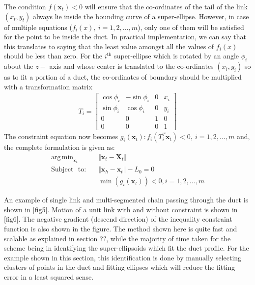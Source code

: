 \documentclass[12pt,a4]{article}
\DeclareMathOperator*{\argmin}{arg\,min}
\begin{document}
The condition $f(\textbf{x}_t)<0$ will ensure that the co-ordinates of the tail of the link $(x_t,y_t)$ always lie inside the bounding curve of a super-ellipse. However, in case of multiple equations (${f_i(x)},~ i=1,2,...,m$), only one of them will be satisfied for the point to be inside the duct. In practical implementation, we can say that this translates to saying that the least value amongst all the values of ${f_i(x)}$ should be less than zero. For the $i^\text{th}$ super-ellipse which is rotated by an angle $\phi_i$ about the $z-$ axis and whose center is translated to the co-ordinates $(x_i,y_i)$ so as to fit a portion of a duct, the co-ordinates of boundary should be multiplied with a transformation matrix
\begin{align}
T_i = \begin{bmatrix}
\cos \phi_i & -\sin\phi_i & 0 & x_i\\
\sin \phi_i & \cos\phi_i & 0 & y_i\\
0 & 0 & 1 &0\\
0 & 0 & 0 & 1
\end{bmatrix}
\end{align}
The constraint equation now becomes $g_i(\textbf{x}_t) : f_i(T_i^T\textbf{x}_t)< 0,~ i=1,2,...,m$ and, the complete formulation is given as:
\begin{align}
\label{eq: min_and_mingx}
\argmin_{\textbf{x}_t} &\Vert \textbf{x}_t-\textbf{X}_t \Vert\\
\text{Subject ~to:~~~} &\Vert \textbf{x}_h - \textbf{x}_t \Vert -L_0 = 0 \nonumber \\
& \min\left(g_i(\textbf{x}_t)\right) < 0, i=1,2,...,m \nonumber
\end{align}

An example of single link and multi-segmented chain passing through the duct is shown in [fig5]. Motion of a unit link with and without constraint is shown in [fig6]. The negative gradient (descend direction) of the inequality constraint function is also shown in the figure. The method shown here is quite fast and scalable as explained in section ??, while the majority of time taken for the scheme being in identifying the super-ellipsoids which fit the duct profile. For the example shown in this section, this identification is done by manually selecting clusters of points in the duct and fitting ellipses which will reduce the fitting error in a least squared sense.
\end{document}
